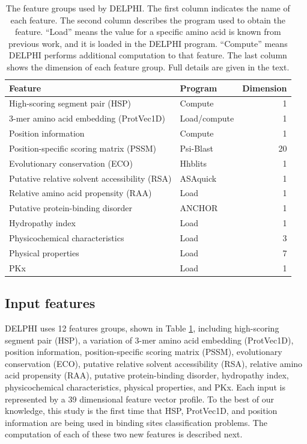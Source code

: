 \documentclass{bioinfo}
\begin{document}
\begin{methods}
\begin{table}[H]
  \centering
  \caption{The feature groups used by DELPHI. The first column indicates the name of each feature. The second column describes the program used to obtain the feature. ``Load'' means the value for a specific amino acid is known from previous work, and it is loaded in the DELPHI program. ``Compute'' means DELPHI performs additional computation to that feature. The last column shows the dimension of each feature group. Full details are given in the text.}
    \begin{tabular}{@{}ll@{}r@{}}
    \toprule
    Feature & Program & Dimension \\
    \midrule
    High-scoring segment pair (HSP) & Compute & 1 \\
    3-mer amino acid embedding (ProtVec1D) & Load/compute & 1 \\
    Position information & Compute & 1 \\
    Position-specific scoring matrix (PSSM) & Psi-Blast & 20 \\
    Evolutionary conservation (ECO) & Hhblits & 1 \\
    Putative relative solvent accessibility (RSA) & ASAquick & 1 \\
    Relative amino acid propensity (RAA) & Load  & 1 \\
    Putative protein-binding disorder & ANCHOR & 1 \\
    Hydropathy index & Load  & 1 \\
    Physicochemical characteristics & Load  & 3 \\
    Physical properties & Load  & 7 \\
    PKx   & Load  & 1 \\
    \bottomrule
    \end{tabular}%
  \label{tab_feture}%
\end{table}%


\subsection{Input features}
DELPHI uses 12 features groups, shown in Table \ref{tab_feture}, including high-scoring segment pair (HSP), a variation of 3-mer amino acid embedding (ProtVec1D), position information, position-specific scoring matrix (PSSM), evolutionary conservation (ECO), putative relative solvent accessibility (RSA), relative amino acid propensity (RAA), putative protein-binding disorder, hydropathy index, physicochemical characteristics, physical properties, and PKx. Each input is represented by a 39 dimensional feature vector profile. To the best of our knowledge, this study is the first time that HSP, ProtVec1D, and position information are being used in binding sites classification problems. The computation of each of these two new features is described next.


\end{methods}
\end{document}
